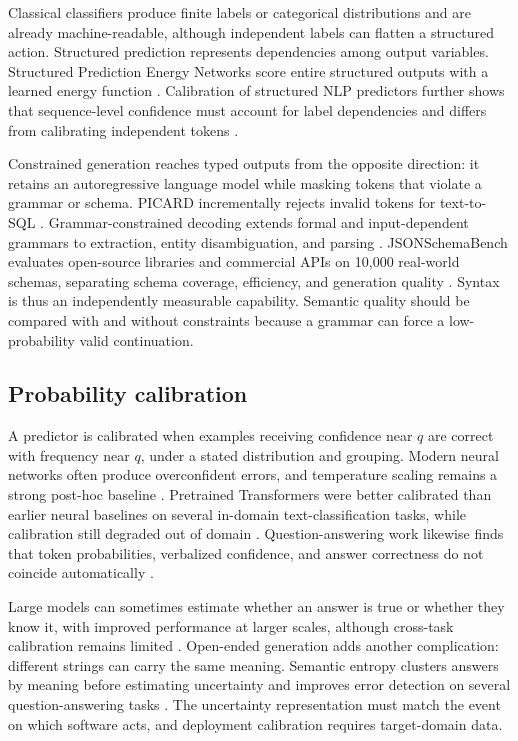 \documentclass[11pt]{article}
\begin{document}
Classical classifiers produce finite labels or categorical distributions and are already machine-readable, although independent labels can flatten a structured action. Structured prediction represents dependencies among output variables. Structured Prediction Energy Networks score entire structured outputs with a learned energy function \cite{belanger2016spen}. Calibration of structured NLP predictors further shows that sequence-level confidence must account for label dependencies and differs from calibrating independent tokens \cite{jagannatha2020structured}.

Constrained generation reaches typed outputs from the opposite direction: it retains an autoregressive language model while masking tokens that violate a grammar or schema. PICARD incrementally rejects invalid tokens for text-to-SQL \cite{scholak2021picard}. Grammar-constrained decoding extends formal and input-dependent grammars to extraction, entity disambiguation, and parsing \cite{geng2023grammar}. JSONSchemaBench evaluates open-source libraries and commercial APIs on 10,000 real-world schemas, separating schema coverage, efficiency, and generation quality \cite{geng2025jsonschema}. Syntax is thus an independently measurable capability. Semantic quality should be compared with and without constraints because a grammar can force a low-probability valid continuation.

\subsection{Probability calibration}

A predictor is calibrated when examples receiving confidence near $q$ are correct with frequency near $q$, under a stated distribution and grouping. Modern neural networks often produce overconfident errors, and temperature scaling remains a strong post-hoc baseline \cite{guo2017calibration}. Pretrained Transformers were better calibrated than earlier neural baselines on several in-domain text-classification tasks, while calibration still degraded out of domain \cite{desai2020calibration}. Question-answering work likewise finds that token probabilities, verbalized confidence, and answer correctness do not coincide automatically \cite{jiang2021know,lin2022verbalized}.

Large models can sometimes estimate whether an answer is true or whether they know it, with improved performance at larger scales, although cross-task calibration remains limited \cite{kadavath2022know}. Open-ended generation adds another complication: different strings can carry the same meaning. Semantic entropy clusters answers by meaning before estimating uncertainty and improves error detection on several question-answering tasks \cite{kuhn2024semantic}. The uncertainty representation must match the event on which software acts, and deployment calibration requires target-domain data.
\end{document}
